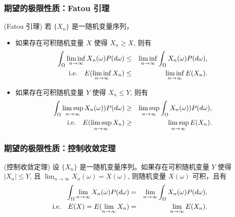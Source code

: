 	\begin{frame}
		\frametitle{期望的极限性质：Fatou 引理}
		\begin{thm}
			(Fatou 引理) 若 $\{X_n\}$ 是一随机变量序列，
			\begin{itemize}
				\item 如果存在可积随机变量 $X$ 使得 $X_n\geq X$, 则有 \begin{eqnarray*}
					\int_{\Omega}\liminf_{n\rightarrow\infty}X_n(\omega)P(d\omega)&\leq& \liminf_{n\rightarrow\infty}\int_\Omega X_n(\omega)P(d\omega),  \\
					{\rm i.e. }\quad  E(\liminf_{n\rightarrow\infty}X_n)&\leq& \liminf_{n\rightarrow\infty}E(X_n).                                                                                           \end{eqnarray*}
				\item 如果存在可积随机变量 $Y$ 使得 $X_n\leq Y$, 则有 \begin{eqnarray*}                                                                                                          \int_{\Omega}\limsup_{n\rightarrow\infty} X_n (\omega)) P (d\omega)&\geq& \limsup_{n\rightarrow\infty}\int_\Omega X_n (\omega)) P (d\omega), \\
					{\rm i.e.} \quad    E(\limsup_{n\rightarrow\infty}X_n)&\geq& \limsup_{n\rightarrow\infty}E(X_n).                                                                                           \end{eqnarray*} \end{itemize}
		\end{thm}

	\end{frame}


	\begin{frame}
		\frametitle{期望的极限性质：控制收敛定理}
		\begin{thm}
			(控制收敛定理) 设 $\{X_n\}$ 是一随机变量序列。如果存在可积随机变量 $Y$ 使得 $|X_n|\leq Y$, 且 $\lim_{n\rightarrow\infty} X_n (\omega)=X (\omega)$, 则随机变量 $X (\omega)$ 可积，且有
			\begin{eqnarray*}
				\int_{\Omega}\lim_{n\rightarrow\infty}X_n(\omega)P(d\omega)&=& \lim_{n\rightarrow\infty}\int_\Omega X_n(\omega)P(d\omega),\\
				\quad{\rm i.e.} \quad    E(X)=E(\lim_{n\rightarrow\infty}X_n)&=&\lim_{n\rightarrow\infty}E(X_n).
			\end{eqnarray*}

		\end{thm}

	\end{frame}

